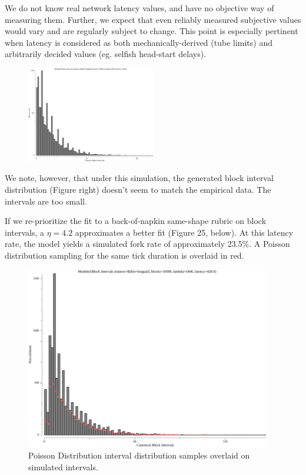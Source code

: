 \documentclass[11pt]{article}
\theoremstyle{plain}
\begin{document}
We do not know real network latency values, and have no objective way of
measuring them. Further, we expect that even reliably measured subjective values
would vary and are regularly subject to change. This point is especially
pertinent when latency is considered as both mechanically-derived (tube limits) and
arbitrarily decided values (eg. selfish head-start delays).

\begin{figure}
    \centering
    \includegraphics[width=0.5\textwidth]{sim_a_anteater.png}
\end{figure}

We note, however, that under this simulation, the generated block interval
distribution (Figure right) doesn't seem to match the empirical data.
The intervals are too small.

If we re-prioritize the fit to a back-of-napkin same-shape rubric on block
intervals, a $\eta=4.2$ approximates a better fit (Figure 25, below). At this
latency rate, the model yields a simulated fork rate of approximately 23.5\%.
A Poisson distribution sampling for the same tick duration is overlaid in red.

\begin{figure}[tph]
    \centering
    \includegraphics[height=8cm]{sim_a_bravo.png}
    \caption{
      Poisson Distribution interval distribution samples
      overlaid on simulated intervals.
    }
    \label{fig:sim_a_bravo}
\end{figure}
\end{document}
